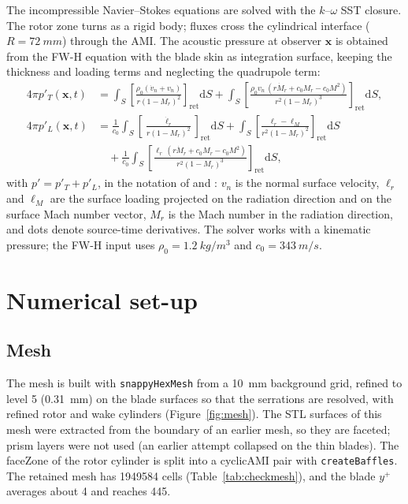 \documentclass[11pt]{article}
\begin{document}
The incompressible Navier--Stokes equations are solved with the $k$--$\omega$ SST closure. The rotor zone turns as a
rigid body; fluxes cross the cylindrical interface ($R=\SI{72}{mm}$) through the AMI. The acoustic pressure at
observer $\mathbf{x}$ is obtained from the FW-H equation with the blade skin as integration surface, keeping the
thickness and loading terms and neglecting the quadrupole term:
\begin{align}
  4\pi p'_T(\mathbf{x},t) &= \int_S\left[\frac{\rho_0(\dot v_n+v_{\dot n})}{r(1-M_r)^2}\right]_{\mathrm{ret}}\!\mathrm{d}S
  +\int_S\left[\frac{\rho_0 v_n\,(r\dot M_r+c_0M_r-c_0M^2)}{r^2(1-M_r)^3}\right]_{\mathrm{ret}}\!\mathrm{d}S,\\
  4\pi p'_L(\mathbf{x},t) &= \frac{1}{c_0}\int_S\left[\frac{\dot\ell_r}{r(1-M_r)^2}\right]_{\mathrm{ret}}\!\mathrm{d}S
  +\int_S\left[\frac{\ell_r-\ell_M}{r^2(1-M_r)^2}\right]_{\mathrm{ret}}\!\mathrm{d}S \nonumber\\
  &\quad+\frac{1}{c_0}\int_S\left[\frac{\ell_r\,(r\dot M_r+c_0M_r-c_0M^2)}{r^2(1-M_r)^3}\right]_{\mathrm{ret}}\!\mathrm{d}S,
\end{align}
with $p'=p'_T+p'_L$, in the notation of \citet{farassat2007} and \citet{brentner2003}: $v_n$ is the normal surface
velocity, $\ell_r$ and $\ell_M$ are the surface loading projected on the radiation direction and on the surface Mach
number vector, $M_r$ is the Mach number in the radiation direction, and dots denote source-time derivatives. The
solver works with a kinematic pressure; the FW-H input uses $\rho_0=\SI{1.2}{kg/m^3}$ and $c_0=\SI{343}{m/s}$.

\section{Numerical set-up}\label{sec:setup}

\subsection{Mesh}

The mesh is built with \texttt{snappyHexMesh} from a \SI{10}{mm} background grid, refined to level 5 (\SI{0.31}{mm})
on the blade surfaces so that the serrations are resolved, with refined rotor and wake cylinders (Figure~\ref{fig:mesh}).
The STL surfaces of this mesh were extracted from the boundary of an earlier mesh, so they are faceted; prism layers were not used (an earlier attempt collapsed on the thin blades). The faceZone
of the rotor cylinder is split into a cyclicAMI pair with \texttt{createBaffles}. The retained mesh has \num{1949584}
cells (Table~\ref{tab:checkmesh}), and the blade $y^+$ averages about 4 and reaches 445.
\end{document}
